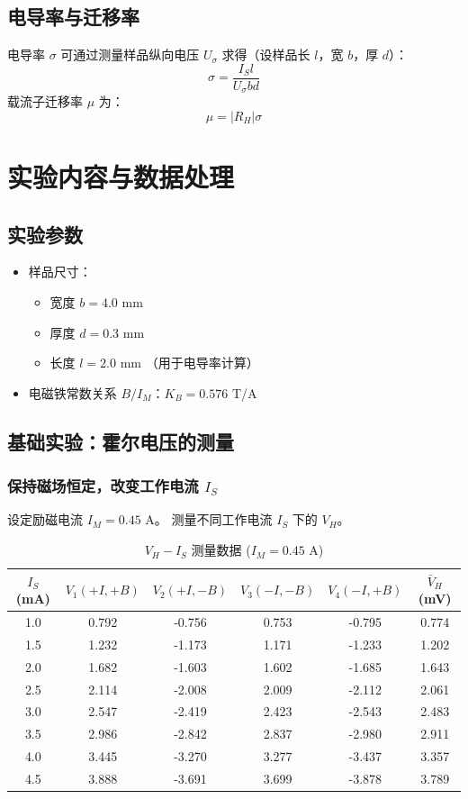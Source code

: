 \documentclass[12pt,a4paper]{article}
\begin{document}
\subsection*{电导率与迁移率}
电导率 $\sigma$ 可通过测量样品纵向电压 $U_\sigma$ 求得（设样品长 $l$，宽 $b$，厚 $d$）：
\[ \sigma = \frac{I_S l}{U_\sigma b d} \]
载流子迁移率 $\mu$ 为：
\[ \mu = |R_H| \sigma \]

\section{实验内容与数据处理}

\subsection{实验参数}
\begin{itemize}
    \item 样品尺寸：
    \begin{itemize}
        \item 宽度 $b = 4.0$ mm
        \item 厚度 $d = 0.3$ mm
        \item 长度 $l = 2.0$ mm （用于电导率计算）
    \end{itemize}
    \item 电磁铁常数关系 $B/I_M$：$K_B = 0.576$ T/A
\end{itemize}

\subsection{基础实验：霍尔电压的测量}

\subsubsection{保持磁场恒定，改变工作电流 $I_S$}
设定励磁电流 $I_M = 0.45$ A。
测量不同工作电流 $I_S$ 下的 $V_H$。

\begin{center}
\begin{table}[h]
\centering
\caption{$V_H - I_S$ 测量数据 ($I_M = 0.45$ A)}
\begin{tabular}{cccccc}
\toprule
$I_S$ (mA) & $V_1 (+I,+B)$ & $V_2 (+I,-B)$ & $V_3 (-I,-B)$ & $V_4 (-I,+B)$ & $\bar{V}_H$ (mV) \\
\midrule
1.0 & 0.792 & -0.756 & 0.753 & -0.795 & 0.774 \\
1.5 & 1.232 & -1.173 & 1.171 & -1.233 & 1.202 \\
2.0 & 1.682 & -1.603 & 1.602 & -1.685 & 1.643 \\
2.5 & 2.114 & -2.008 & 2.009 & -2.112 & 2.061 \\
3.0 & 2.547 & -2.419 & 2.423 & -2.543 & 2.483 \\
3.5 & 2.986 & -2.842 & 2.837 & -2.980 & 2.911 \\
4.0 & 3.445 & -3.270 & 3.277 & -3.437 & 3.357 \\
4.5 & 3.888 & -3.691 & 3.699 & -3.878 & 3.789 \\
\bottomrule
\end{tabular}
\end{table}
\end{center}
\end{document}
